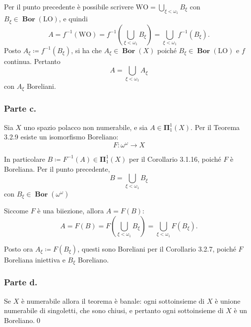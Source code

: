 \documentclass{article}
\newcommand{\1}{\mathds{1}}
\begin{document}
Per il punto precedente è possibile scrivere \(\mathrm{WO} = \bigcup_{\xi<\omega_{1}} B_{\xi}\) con \(B_{\xi} \in \bm{{\operatorname{Bor}}}(\mathrm{LO})\), e quindi
\begin{equation*}
A = f^{-1}(\mathrm{WO}) = f^{-1}\left(\bigcup_{\xi<\omega_{1}} B_{\xi}\right) = \bigcup_{\xi<\omega_{1}} f^{-1}(B_{\xi}).
\end{equation*}
Posto \(A_{\xi}\coloneqq f^{-1}(B_{\xi})\), si ha che \(A_{\xi} \in \bm{{\operatorname{Bor}}}(X)\) poiché \(B_{\xi} \in \bm{{\operatorname{Bor}}}(\mathrm{LO})\) e \(f\) continua. Pertanto
\begin{equation*}
A=\bigcup_{\xi<\omega_{1}} A_{\xi}
\end{equation*}
con \(A_{\xi}\) Boreliani.
\subsubsection{Parte c.}
\label{sec:org8cce25d}

Sia \(X\) uno spazio polacco non numerabile, e sia \(A \in \bm{\Pi}_{1}^1(X)\). Per il Teorema 3.2.9 esiste un isomorfismo Boreliano:
\begin{equation*}
F: \omega^{\omega}\to X
\end{equation*}

In particolare \(B\coloneqq F^{-1}(A) \in \bm{\Pi}_{1}^{1}(X)\) per il Corollario 3.1.16, poiché \(F\) è Boreliana. Per il punto precedente,
\begin{equation*}
B=\bigcup_{\xi<\omega_{1}} B_{\xi}
\end{equation*}
con \(B_{\xi} \in \bm{{\operatorname{Bor}}}(\omega^{\omega})\)

Siccome \(F\) è una biiezione, allora \(A=F(B)\):
\begin{equation*}
A= F(B) = F\left(\bigcup_{\xi<\omega_{1}} B_{\xi}\right) = \bigcup_{\xi<\omega_{1}} F(B_{\xi}).
\end{equation*}

Posto ora \(A_{\xi} \coloneqq F(B_{\xi})\), questi sono Boreliani per il Corollario 3.2.7, poiché \(F\) Boreliana iniettiva e \(B_{\xi}\) Boreliano.
\subsubsection{Parte d.}
\label{sec:org7b2d0ec}

Se \(X\) è numerabile allora il teorema è banale: ogni sottoinsieme di \(X\) è unione numerabile di singoletti, che sono chiusi, e pertanto ogni sottoinsieme di \(X\) è un Boreliano.\qed
\end{document}
